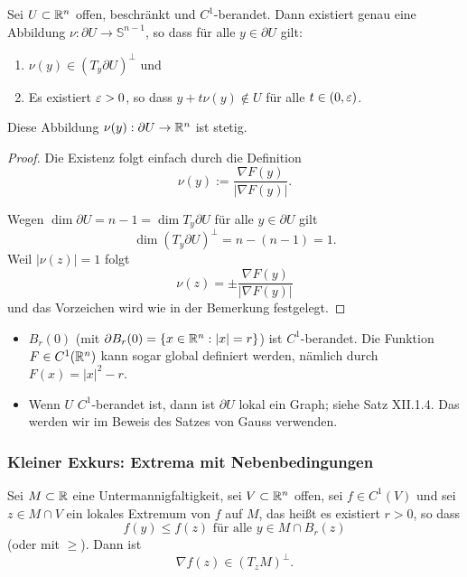 \begin{kor}
 Sei $U \subset \mathbb{R}^n$ offen, beschränkt und $C^1$-berandet. Dann existiert genau eine Abbildung $\nu: \partial U \to \mathbb{S}^{n-1}$, so dass für alle $y \in \partial U$ gilt:
 \begin{enumerate}
  \item $\nu(y) \in (T_y \partial U)^\perp$ und
  \item Es existiert $\varepsilon > 0$, so dass $y + t \nu(y) \notin U$ für alle $t \in (0,\varepsilon)$.
 \end{enumerate}
 Diese Abbildung $\nu(y) : \partial U \to \mathbb{R}^n$ ist stetig.
\end{kor}

\begin{proof}
 Die Existenz folgt einfach durch die Definition
 \[ \nu(y) := \frac{\nabla F(y)}{|\nabla F(y)|}. \]
 
 Wegen  $\dim \partial U = n-1 = \dim T_y \partial U$ für alle $y \in \partial U$ gilt
 \[ \dim( T_y \partial U )^\perp = n - (n-1) = 1. \]
 Weil $|\nu(z)| = 1$ folgt
 \[ \nu(z) = \pm \frac{\nabla F(y)}{|\nabla F(y)|} \]
 und das Vorzeichen wird wie in der Bemerkung festgelegt.
\end{proof}

\begin{exmp}
 \begin{itemize}
  \item $B_r(0)$ (mit $\partial B_r(0) = \{ x \in \mathbb{R}^n : |x| = r \}$) ist $C^1$-berandet. Die Funktion $F \in C^1(\mathbb{R}^n)$ kann sogar global definiert werden, nämlich durch $F(x) = |x|^2 - r$.
  \item Wenn $U$ $C^1$-berandet ist, dann ist $\partial U$ lokal ein Graph; siehe Satz XII.1.4. Das werden wir im Beweis des Satzes von Gauss verwenden.
 \end{itemize}
\end{exmp}

\clearpage

\subsubsection{Kleiner Exkurs: Extrema mit Nebenbedingungen}
\begin{thm}
 Sei $M \subset \mathbb{R}$ eine Untermannigfaltigkeit, sei $V \subset \mathbb{R}^n$ offen, sei $f \in C^1(V)$ und sei $z \in M \cap V$ ein lokales Extremum von $f$ auf $M$, das heißt es existiert $r > 0$, so dass
 \[ f(y) \le f(z) \text{ für alle } y \in M \cap B_r(z) \]
 (oder mit $\ge$). Dann ist
 \[ \nabla f(z) \in (T_z M)^\perp. \]
\end{thm}

